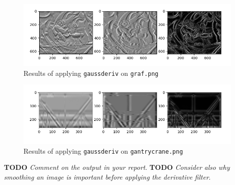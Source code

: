 \documentclass{article}
\begin{document}
\begin{figure}[ht]
    \centering
    \includegraphics[width=\textwidth]{images/Q1.e-graf-gaussderived.png}
    \cprotect\caption{Results of applying \verb|gaussderiv| on \verb|graf.png|}
    \label{fig:gaussderiv-graf.png}
\end{figure}

\begin{figure}[ht]
    \centering
    \includegraphics[width=\textwidth]{images/Q1.e-gantrycrane-gaussderived.png}
    \cprotect\caption{Results of applying \verb|gaussderiv| on \verb|gantrycrane.png|}
    \label{fig:gaussderiv-gantrycrane.png}
\end{figure}

\noindent
{\color{red} \large \textbf{TODO}} \textit{Comment on the output in your report}.
\newline
{\color{red} \large \textbf{TODO}} \textit{Consider also why smoothing an image is important before applying the derivative filter}.
\end{document}
